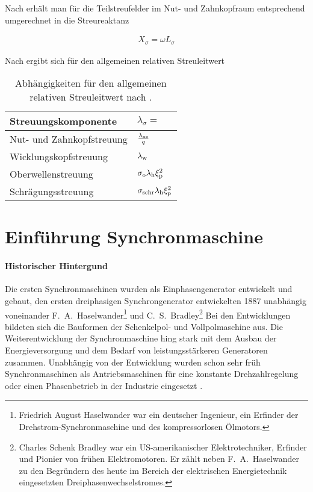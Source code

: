 Nach \textcite[S.~323]{mullerII2008} erhält man für die Teilstreufelder im Nut- und Zahnkopfraum entsprechend umgerechnet in die Streureaktanz

\begin{align}
X_{\sigma} = \omega L_{\sigma}
\end{align}

Nach \textcite[S.~533--536]{mullerII2008} ergibt sich für den allgemeinen relativen Streuleitwert

\begin{table}[htb]
\centering
\caption{Abhängigkeiten für den allgemeinen relativen Streuleitwert nach \textcite{mullerII2008}.}
\begin{tabular}{ll}
\toprule
Streuungskomponente	&	$\lambda_{\sigma} =$ \\
\midrule
Nut- und Zahnkopfstreuung	&	$\frac{\lambda_{\mathrm{nz}}}{q}$ \\
Wicklungskopfstreuung		&	$\lambda_{\mathrm{w}}$ \\
Oberwellenstreuung			&	$\sigma_{\mathrm{o}}\lambda_{\mathrm{h}}\xi^{2}_{\mathrm{p}}$	\\
Schrägungsstreuung			&	$\sigma_{\mathrm{schr}}\lambda_{\mathrm{h}}\xi^{2}_{\mathrm{p}}$ \\
\bottomrule
\end{tabular}
\end{table} 

\section{Einführung Synchronmaschine}\label{sec:synchron}

\paragraph{Historischer Hintergund} Die ersten Synchronmaschinen wurden als Einphasengenerator entwickelt und gebaut, den ersten dreiphasigen Synchrongenerator entwickelten 1887 unabhängig voneinander F.~A.~Haselwander\footnote{Friedrich August Haselwander war ein deutscher Ingenieur, ein Erfinder der Drehstrom-Synchronmaschine und des kompressorlosen Ölmotors.} und C.~S.~Bradley\footnote{Charles Schenk Bradley war ein US-amerikanischer Elektrotechniker, Erfinder und Pionier von frühen Elektromotoren. Er zählt neben F.~A.~Haselwander zu den Begründern des heute im Bereich der elektrischen Energietechnik eingesetzten Dreiphasenwechselstromes.} Bei den Entwicklungen bildeten sich die Bauformen der Schenkelpol- und Vollpolmaschine aus. Die Weiterentwicklung der Synchronmaschine hing stark mit dem Ausbau der Energieversorgung und dem Bedarf von leistungsstärkeren Generatoren zusammen. Unabhängig von der Entwicklung wurden schon sehr früh Synchronmaschinen als Antriebsmaschinen für eine konstante Drehzahlregelung oder einen Phasenbetrieb in der Industrie eingesetzt \autocites[S.~287]{fischer2009}[S.~485f.]{mullerI2005}.

